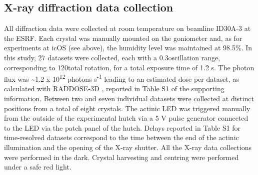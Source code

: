 \subsection{X-ray diffraction data collection}
All diffraction data were collected at room temperature on beamline ID30A-3 \parencite{vonstettenID30A3MASSIF3Beamline2020} at the ESRF. Each crystal was manually mounted on the goniometer and, as for experiments at icOS (see above), the humidity level was maintained at 98.5\%. In this study, 27 datasets were collected, each with a 0.3\degree oscillation range, corresponding to 120\degree total rotation, for a total exposure time of 1.2 s. The photon flux was \textasciitilde1.2 x 10\textsuperscript{12} photons s\textsuperscript{-1} leading to an estimated dose per dataset, as calculated with RADDOSE-3D \parencite{zeldinRADDOSE3DTimeSpaceresolved2013}, reported in Table S1 of the supporting information. Between two and seven individual datasets were collected at distinct positions from a total of eight crystals. The actinic LED was triggered manually from the outside of the experimental hutch via a 5 V pulse generator connected to the LED via the patch panel of the hutch. Delays reported in Table S1 for time-resolved datasets correspond to the time between the end of the actinic illumination and the opening of the X-ray shutter. All the X-ray data collections were performed in the dark. Crystal harvesting and centring were performed under a safe red light.
